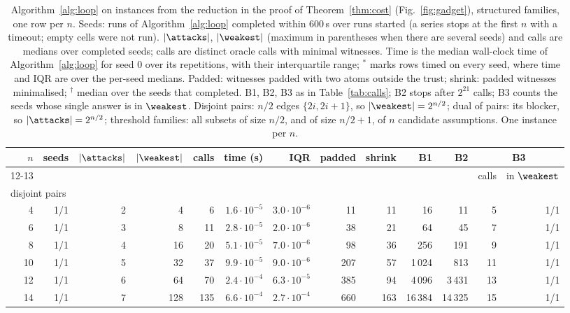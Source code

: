 \begin{table}[p]
\caption{Algorithm~\ref{alg:loop} on instances from the reduction in the proof of Theorem~\ref{thm:cost} (Fig.~\ref{fig:gadget}), structured families, one row per $n$. Seeds: runs of Algorithm~\ref{alg:loop} completed within 600\,s over runs started (a series stops at the first $n$ with a timeout; empty cells were not run). $|\attacks|$, $|\weakest|$ (maximum in parentheses when there are several seeds) and calls are medians over completed seeds; calls are distinct oracle calls with minimal witnesses. Time is the median wall-clock time of Algorithm~\ref{alg:loop} for seed 0 over its repetitions, with their interquartile range; $^{*}$ marks rows timed on every seed, where time and IQR are over the per-seed medians. Padded: witnesses padded with two atoms outside the trust; shrink: padded witnesses minimalised; $^{\dagger}$ median over the seeds that completed. B1, B2, B3 as in Table~\ref{tab:calls}; B2 stops after $2^{21}$ calls; B3 counts the seeds whose single answer is in $\weakest$. Disjoint pairs: $n/2$ edges $\{2i, 2i{+}1\}$, so $|\weakest| = 2^{n/2}$; dual of pairs: its blocker, so $|\attacks| = 2^{n/2}$; threshold families: all subsets of size $n/2$, and of size $n/2+1$, of $n$ candidate assumptions. One instance per $n$.}
\label{tab:scale-struct}
\centering
\setlength{\tabcolsep}{2.6pt}
\scriptsize
\begin{tabular}{r r r r r r r r r r r r r}
\toprule
$n$ & seeds & $|\attacks|$ & $|\weakest|$ & calls & time (s) & IQR & padded & shrink & B1 & B2 & \multicolumn{2}{c}{B3}\\
\cmidrule(lr){12-13}
 & & & & & & & & & & & calls & in $\weakest$\\
\midrule
\multicolumn{13}{l}{disjoint pairs}\\
4 & 1/1 & 2 & 4 & 6 & $1.6{\cdot}10^{-5}$ & $3.0{\cdot}10^{-6}$ & 11 & 11 & 16 & 11 & 5 & 1/1\\
6 & 1/1 & 3 & 8 & 11 & $2.8{\cdot}10^{-5}$ & $2.0{\cdot}10^{-6}$ & 38 & 21 & 64 & 45 & 7 & 1/1\\
8 & 1/1 & 4 & 16 & 20 & $5.1{\cdot}10^{-5}$ & $7.0{\cdot}10^{-6}$ & 98 & 36 & 256 & 191 & 9 & 1/1\\
10 & 1/1 & 5 & 32 & 37 & $9.9{\cdot}10^{-5}$ & $9.0{\cdot}10^{-6}$ & 207 & 57 & 1\,024 & 813 & 11 & 1/1\\
12 & 1/1 & 6 & 64 & 70 & $2.4{\cdot}10^{-4}$ & $6.3{\cdot}10^{-5}$ & 385 & 94 & 4\,096 & 3\,431 & 13 & 1/1\\
14 & 1/1 & 7 & 128 & 135 & $6.6{\cdot}10^{-4}$ & $2.7{\cdot}10^{-4}$ & 660 & 163 & 16\,384 & 14\,325 & 15 & 1/1\\

\end{tabular}
\end{table}
